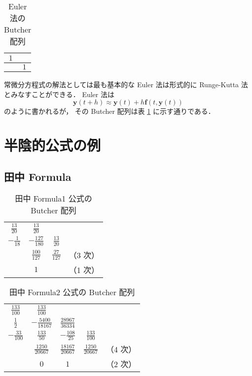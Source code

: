 \begin{table}[bp]
    \caption{Euler 法の Butcher 配列}
    \label{table:ode_runge-kutta_butcher-array-explicit-euler}
    \centering
    \begin{tabular}{c|c}
        $1$ &     \\
        \hline
            & $1$
    \end{tabular}
\end{table}

常微分方程式の解法としては最も基本的な Euler 法は形式的に Runge-Kutta 法とみなすことができる．
Euler 法は
\begin{equation}
    \bm{y}(t + h) \approx \bm{y}(t) + h \bm{f}(t, \bm{y}(t))
\end{equation}
のように書かれるが，
その Butcher 配列は表 \ref{table:ode_runge-kutta_butcher-array-explicit-euler} に示す通りである．

\section{半陰的公式の例}

\subsection{田中 Formula}

\begin{table}[bp]
    \caption{田中 Formula1 公式の Butcher 配列}
    \label{table:ode_runge-kutta_butcher-array-tanaka-formula1}
    \centering
    \begin{tabular}{c|ccc}
        $\frac{13}{20}$ & $\frac{13}{20}$    &                  &       \\
        $-\frac{1}{18}$ & $-\frac{127}{180}$ & $\frac{13}{20}$  &       \\
        \hline
                        & $\frac{100}{127}$  & $\frac{27}{127}$ & （3 次） \\
                        & $1$                &                  & （1 次）
    \end{tabular}
\end{table}

\begin{table}[bp]
    \caption{田中 Formula2 公式の Butcher 配列}
    \label{table:ode_runge-kutta_butcher-array-tanaka-formula2}
    \centering
    \begin{tabular}{c|cccc}
        $\frac{133}{100}$ & $\frac{133}{100}$     &                       &                      &       \\
        $\frac{1}{2}$     & $-\frac{5400}{18167}$ & $\frac{28967}{36334}$ &                      &       \\
        $-\frac{33}{100}$ & $\frac{133}{50}$      & $-\frac{108}{25}$     & $\frac{133}{100}$    &       \\
        \hline
                          & $\frac{1250}{20667}$  & $\frac{18167}{20667}$ & $\frac{1250}{20667}$ & （4 次） \\
                          & $0$                   & $1$                   &                      & （2 次）
    \end{tabular}
\end{table}

